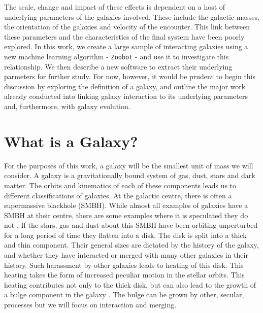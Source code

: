 The scale, change and impact of these effects is dependent on a host of underlying parameters of the galaxies involved. These include the galactic masses, the orientation of the galaxies and velocity of the encounter. This link between these parameters and the characteristics of the final system have been poorly explored. In this work, we create a large sample of interacting galaxies using a new machine learning algorithm - \texttt{Zoobot} - and use it to investigate this relationship. We then describe a new software to extract their underlying parmeters for further study. For now, however, it would be prudent to begin this discussion by exploring the definition of a galaxy, and outline the major work already conducted into linking galaxy interaction to its underlying parameters and, furthermore, with galaxy evolution.

\section{What is a Galaxy?}
\noindent For the purposes of this work, a galaxy will be the smallest unit of mass we will consider. A galaxy is a gravitationally bound system of gas, dust, stars and dark matter. The orbits and kinematics of each of these components leads us to different classifications of galaxies. At the galactic centre, there is often a supermassive blackhole (SMBH). While almost all examples of galaxies have a SMBH at their centre, there are some examples where it is speculated they do not \citep{2001AJ....122.2469G}. If the stars, gas and dust about this SMBH have been orbiting unperturbed for a long period of time they flatten into a disk. The disk is split into a thick and thin component. Their general sizes are dictated by the history of the galaxy, and whether they have interacted or merged with many other galaxies in their history. Such harassment by other galaxies leads to heating of this disk. This heating takes the form of increased peculiar motion in the stellar orbits. This heating contributes not only to the thick disk, but can also lead to the growth of a bulge component in the galaxy \citep{2010ApJ...715..202H, 2017ApJ...837L...8B}. The bulge can be grown by other, secular, processes but we will focus on interaction and merging.

